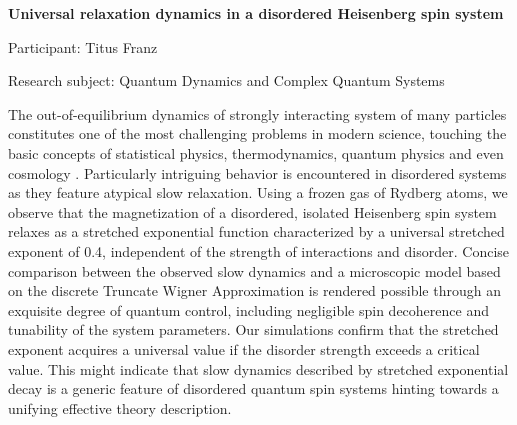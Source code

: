 \begin{minipage}[t]{1.0\textwidth}

\begin{center}

{{\large\bfseries Universal relaxation dynamics in a disordered Heisenberg spin system}\par}

\end{center}

{\noindent Participant: Titus Franz\par} 

{\noindent Research subject: Quantum Dynamics and Complex Quantum Systems\par}\medskip

\noindent The out-of-equilibrium dynamics of strongly interacting
system of many particles constitutes one of the most
challenging problems in modern science, touching the
basic concepts of statistical physics, thermodynamics,
quantum physics and even cosmology . Particularly intriguing
behavior is encountered in disordered systems as
they feature atypical slow relaxation. Using a frozen gas of Rydberg
atoms, we observe that the magnetization of a disordered,
isolated Heisenberg spin system relaxes as a stretched exponential
function characterized by a universal stretched
exponent of 0.4, independent of the strength of interactions
and disorder. Concise comparison between the
observed slow dynamics and a microscopic model based
on the discrete Truncate Wigner Approximation is rendered
possible through an exquisite degree of quantum
control, including negligible spin decoherence and tunability
of the system parameters. Our simulations confirm that
the stretched exponent acquires a universal value if the
disorder strength exceeds a critical value. This might indicate
that slow dynamics described by stretched exponential
decay is a generic feature of disordered quantum
spin systems hinting towards a unifying effective theory
description.\par\end{minipage}

\hfill 


